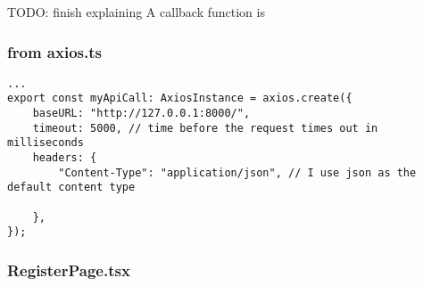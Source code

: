 TODO: finish explaining
A callback function is 

\subsubsection{from axios.ts}
\begin{verbatim}
...
export const myApiCall: AxiosInstance = axios.create({
    baseURL: "http://127.0.0.1:8000/", 
    timeout: 5000, // time before the request times out in milliseconds
    headers: {
        "Content-Type": "application/json", // I use json as the default content type 
        
    },
});
\end{verbatim}

\subsubsection{RegisterPage.tsx}
